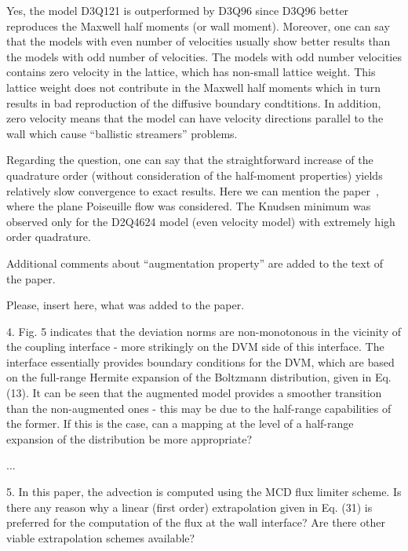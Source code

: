 \documentclass{article}
\begin{document}
Yes, the model D3Q121 is outperformed by D3Q96
since D3Q96 better reproduces the Maxwell half moments (or wall moment).
Moreover, one can say that the models with even number of velocities usually show better results
than the models with odd number of velocities.
The models with odd number velocities contains zero velocity in the lattice,
which has non-small lattice weight.
This lattice weight does not contribute in the Maxwell half moments
which in turn results in bad reproduction of the diffusive boundary condtitions.
In addition, zero velocity means that the model can have velocity directions parallel to the wall
which cause ``ballistic streamers'' problems.

Regarding the question, one can say that the straightforward increase of the quadrature order
(without consideration of the half-moment properties)
yields relatively slow convergence to exact results.
Here we can mention the paper~\cite{Meng2011accuracy},
where the plane Poiseuille flow was considered.
The Knudsen minimum was observed only for the D2Q4624 model (even velocity model)
with extremely high order quadrature.

Additional comments about ``augmentation property'' are added to the text of the paper.

\begin{leftbar}
Please, insert here, what was added to the paper.
\end{leftbar}

\begin{quoting}
    4. Fig. 5 indicates that the deviation norms are
    non-monotonous in the vicinity of the coupling
    interface - more strikingly on the DVM side of this
    interface. The interface essentially provides boundary
    conditions for the DVM, which are based on the
    full-range Hermite expansion of the Boltzmann
    distribution, given in Eq. (13). It can be seen that
    the augmented model provides a smoother transition than
    the non-augmented ones - this may be due to the
    half-range capabilities of the former. If this is
    the case, can a mapping at the level of a half-range
    expansion of the distribution be more appropriate?
\end{quoting}

...

\begin{leftbar}
\end{leftbar}

\begin{quoting}
    5. In this paper, the advection is computed using
    the MCD flux limiter scheme. Is there any reason why
    a linear (first order) extrapolation given in
    Eq. (31) is preferred for the computation of the
    flux at the wall interface? Are there other viable
    extrapolation schemes available?
\end{quoting}
\end{document}
